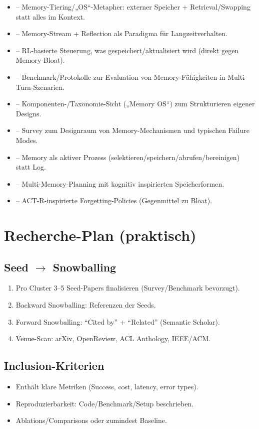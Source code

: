 \begin{itemize}
  \item \cite{packer2023memgpt} -- Memory-Tiering/„OS“-Metapher: externer Speicher + Retrieval/Swapping statt alles im Kontext.
  \item \cite{park2023generative_agents} -- Memory-Stream + Reflection als Paradigma für Langzeitverhalten.
  \item \cite{yu2025memagent} -- RL-basierte Steuerung, was gespeichert/aktualisiert wird (direkt gegen Memory-Bloat).
  \item \cite{hu2025memoryagentbench} -- Benchmark/Protokolle zur Evaluation von Memory-Fähigkeiten in Multi-Turn-Szenarien.
  \item \cite{kang2025memoryos} -- Komponenten-/Taxonomie-Sicht („Memory OS“) zum Strukturieren eigener Designs.
  \item \cite{zhang2024survey_memory_mechanism_agents} -- Survey zum Designraum von Memory-Mechanismen und typischen Failure Modes.
  \item \cite{xu2025amem_agentic_memory} -- Memory als aktiver Prozess (selektieren/speichern/abrufen/bereinigen) statt Log.
  \item \cite{yanfangzhou-etal-2025-m2pa} -- Multi-Memory-Planning mit kognitiv inspirierten Speicherformen.
  \item \cite{honda2025humanlike_remembering_forgetting_actr} -- ACT-R-inspirierte Forgetting-Policies (Gegenmittel zu Bloat).
\end{itemize}

\section{Recherche-Plan (praktisch)}
\subsection{Seed $\rightarrow$ Snowballing}
\begin{enumerate}
  \item Pro Cluster 3--5 Seed-Papers finalisieren (Survey/Benchmark bevorzugt).
  \item Backward Snowballing: Referenzen der Seeds.
  \item Forward Snowballing: ``Cited by'' + ``Related'' (Semantic Scholar).
  \item Venue-Scan: arXiv, OpenReview, ACL Anthology, IEEE/ACM.
\end{enumerate}

\subsection{Inclusion-Kriterien}
\begin{itemize}
  \item Enthält klare Metriken (Success, cost, latency, error types).
  \item Reproduzierbarkeit: Code/Benchmark/Setup beschrieben.
  \item Ablations/Comparisons oder zumindest Baseline.
\end{itemize}


